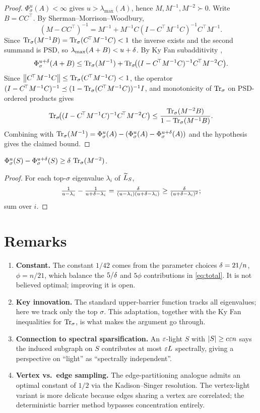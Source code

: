 \documentclass[11pt]{article}
\begin{document}
\begin{proof}
$\Phi^u_\sigma(A)<\infty$ gives $u>\lambda_{\max}(A)$, hence
$M,M^{-1},M^{-2}\succ 0$. Write $B=CC^{\!\top}$. By Sherman--Morrison--Woodbury,
\[
  (M-CC^{\!\top})^{-1}
   = M^{-1} + M^{-1}C(I-C^{\!\top}M^{-1}C)^{-1}C^{\!\top}M^{-1}.
\]
Since $\operatorname{Tr}_{\sigma}(M^{-1}B)=\operatorname{Tr}_{\sigma}(C^{\!\top}M^{-1}C)<1$ the inverse exists and the
second summand is PSD, so $\lambda_{\max}(A+B)<u+\delta$. By Ky Fan
subadditivity \cite[Thm.~4.3.47a]{HJ12},
\[
  \Phi^{u+\delta}_\sigma(A+B)
   \le \operatorname{Tr}_{\sigma}(M^{-1})
       + \operatorname{Tr}_{\sigma}\!\bigl((I-C^{\!\top}M^{-1}C)^{-1}C^{\!\top}M^{-2}C\bigr).
\]
Since $\left\lVert C^{\!\top}M^{-1}C \right\rVert\le\operatorname{Tr}_{\sigma}(C^{\!\top}M^{-1}C)<1$, the operator
$(I-C^{\!\top}M^{-1}C)^{-1}\preceq(1-\operatorname{Tr}_{\sigma}(C^{\!\top}M^{-1}C))^{-1}I$, and
monotonicity of $\operatorname{Tr}_{\sigma}$ on PSD-ordered products gives
\[
  \operatorname{Tr}_{\sigma}\!\bigl((I-C^{\!\top}M^{-1}C)^{-1}C^{\!\top}M^{-2}C\bigr)
   \le \frac{\operatorname{Tr}_{\sigma}(M^{-2}B)}{1-\operatorname{Tr}_{\sigma}(M^{-1}B)}.
\]
Combining with
$\operatorname{Tr}_{\sigma}(M^{-1})=\Phi^u_\sigma(A)-(\Phi^u_\sigma(A)-\Phi^{u+\delta}_\sigma(A))$
and the hypothesis gives the claimed bound.
\end{proof}

\begin{qsixclaim}\label{cl:phi-diff}
$\Phi^u_\sigma(S)-\Phi^{u+\delta}_\sigma(S)\ge\delta\,\operatorname{Tr}_{\sigma}(M^{-2})$.
\end{qsixclaim}
\begin{proof}
For each top-$\sigma$ eigenvalue $\lambda_i$ of $\widetilde{L}_S$,
\[
  \tfrac{1}{u-\lambda_i}-\tfrac{1}{u+\delta-\lambda_i}
   = \tfrac{\delta}{(u-\lambda_i)(u+\delta-\lambda_i)}
   \ge \tfrac{\delta}{(u+\delta-\lambda_i)^2};
\]
sum over $i$.
\end{proof}

\section*{Remarks}

\begin{enumerate}\setlength\itemsep{4pt}
\item \textbf{Constant.} The constant $1/42$ comes from the parameter choices
$\delta=21/n$, $\phi=n/21$, which balance the $5/\delta$ and $5\phi$ contributions
in \eqref{eq:total}. It is not believed optimal; improving it is open.
\item \textbf{Key innovation.} The standard upper-barrier function tracks all
eigenvalues; here we track only the top $\sigma$. This adaptation, together
with the Ky Fan inequalities for $\operatorname{Tr}_{\sigma}$, is what makes the argument go
through.
\item \textbf{Connection to spectral sparsification.} An $\varepsilon$-light $S$ with
$|S|\ge c\varepsilon n$ says the induced subgraph on $S$ contributes at most $\varepsilon L$
spectrally, giving a perspective on ``light'' as ``spectrally independent''.
\item \textbf{Vertex vs.\ edge sampling.} The edge-partitioning analogue
admits an optimal constant of $1/2$ via the Kadison--Singer resolution. The
vertex-light variant is more delicate because edges sharing a vertex are
correlated; the deterministic barrier method bypasses concentration entirely.
\end{enumerate}
\end{document}
